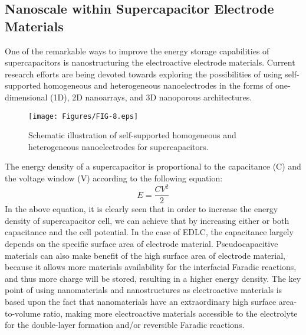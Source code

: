 \documentclass[reprint,amsmath,amssymb,aps,floatfix,
]{revtex4-2}
\begin{document}
\subsection{\label{sec:level3}Nanoscale within Supercapacitor Electrode Materials}
One of the remarkable ways to improve the energy storage capabilities of supercapacitors is nanostructuring the electroactive electrode materials. Current research efforts are being devoted towards exploring the possibilities of using self-supported homogeneous and heterogeneous nanoelectrodes in the forms of one-dimensional (1D), 2D nanoarrays, and 3D nanoporous architectures.
\begin{figure}[b]
    \centering
    \texttt{[image: Figures/FIG-8.eps]}
    \caption{\label{fig:fig8}Schematic illustration of self-supported homogeneous and heterogeneous nanoelectrodes for supercapacitors.\cite{Huaping2017}}
    \end{figure}
The energy density of a supercapacitor is proportional to the capacitance (C) and the voltage window (V) according to the following equation:
\begin{equation}
    E = \frac{CV^2}{2} 
\end{equation}
In the above equation, it is clearly seen that in order to increase the energy density of supercapacitor cell, we can achieve that by increasing either or both capacitance and the cell potential. In the case of EDLC, the capacitance largely depends on the specific surface area of electrode material. Pseudocapacitive materials can also make benefit of the high surface area of electrode material, because it allows more materials availability for the interfacial Faradic reactions, and thus more charge will be stored, resulting in a higher energy density. The key point of using nanomaterials and nanostructures as electroactive materials is based upon the fact that nanomaterials have an extraordinary high surface area-to-volume ratio, making more electroactive materials accessible to the electrolyte for the double-layer formation and/or reversible Faradic reactions.\cite{ograve2005}
\end{document}
